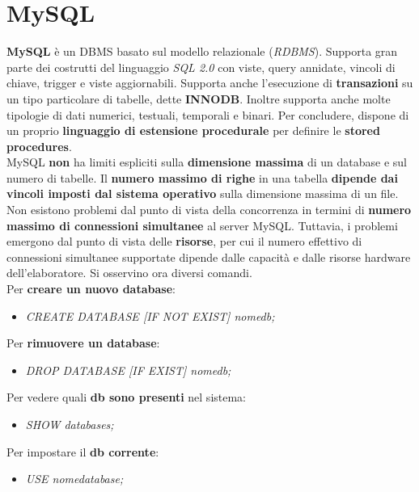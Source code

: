 \documentclass{article}
\begin{document}
\pagestyle{empty}

\section*{MySQL} 
\large

\textbf{MySQL} è un DBMS basato sul modello relazionale (\textit{RDBMS}). Supporta gran parte dei costrutti del linguaggio \textit{SQL 2.0} con viste, query annidate, vincoli di chiave, trigger e viste aggiornabili. Supporta anche l'esecuzione di \textbf{transazioni} su un tipo particolare di tabelle, dette \textbf{INNODB}. Inoltre supporta anche molte tipologie di dati numerici, testuali, temporali e binari. Per concludere, dispone di un proprio \textbf{linguaggio di estensione procedurale} per definire le \textbf{stored procedures}.\vspace{14pt}\\
MySQL \textbf{non} ha limiti espliciti sulla \textbf{dimensione massima} di un database e sul numero di tabelle. Il \textbf{numero massimo di righe} in una tabella \textbf{dipende dai vincoli imposti dal sistema operativo} sulla dimensione massima di un file.\\
Non esistono problemi dal punto di vista della concorrenza in termini di \textbf{numero massimo di connessioni simultanee} al server MySQL. Tuttavia, i problemi emergono dal punto di vista delle \textbf{risorse}, per cui il numero effettivo di connessioni simultanee supportate dipende dalle capacità e dalle risorse hardware dell’elaboratore. Si osservino ora diversi comandi.\vspace{14pt}\\
Per \textbf{creare un nuovo database}:
\begin{itemize}[label={ }, leftmargin=1cm]
    \item \textit{CREATE DATABASE [IF NOT EXIST] nomedb;}
\end{itemize}
Per \textbf{rimuovere un database}:
\begin{itemize}[label={ }, leftmargin=1cm]
    \item \textit{DROP DATABASE [IF EXIST] nomedb;}
\end{itemize}
Per vedere quali \textbf{db sono presenti} nel sistema:
\begin{itemize}[label={ }, leftmargin=1cm]
    \item \textit{SHOW databases;}
\end{itemize}
Per impostare il \textbf{db corrente}:
\begin{itemize}[label={ }, leftmargin=1cm]
    \item \textit{USE nomedatabase;}
\end{itemize}
\end{document}
